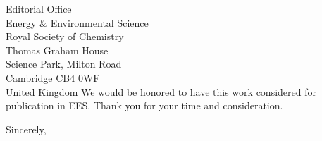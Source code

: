 \documentclass[11pt]{letter}
\begin{document}
\begin{letter}{Editorial Office\\
Energy \& Environmental Science\\
Royal Society of Chemistry\\
Thomas Graham House\\
Science Park, Milton Road\\
Cambridge CB4 0WF\\
United Kingdom}
We would be honored to have this work considered for publication in EES. Thank you for your time and consideration.

\closing{Sincerely,}

\end{letter}
\end{document}

